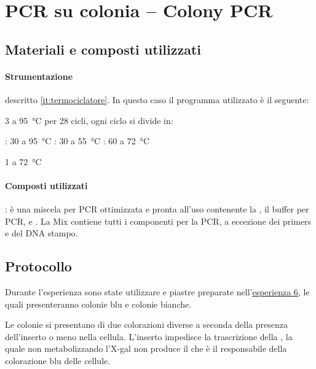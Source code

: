 \section{PCR su colonia -- \foreignlanguage{english}{Colony PCR}}

\subsection{Materiali e composti utilizzati}
\paragraph{Strumentazione}
\begin{itemize}
	\itemb[Termociclatore:] descritto \autoref{it:termociclatore}. In questo caso il programma utilizzato è il seguente:
	\begin{itemize}[squareItem]
		 \qty{3}{\min} a \qty{95}{\celsius}
		\itemb[Amplificazione] per 28 cicli, ogni ciclo si divide in:
		\begin{itemize}[squareItem]
			\itemb[Denaturazione]: \qty{30}{\sec} a \qty{95}{\celsius}
			\itemb[Ibridazione]: \qty{30}{\sec} a \qty{55}{\celsius}
			\itemb[Estensione]: \qty{60}{\sec} a \qty{72}{\celsius}
		\end{itemize}
		 \qty{1}{\min} a \qty{72}{\celsius}
	\end{itemize}
\end{itemize}

\paragraph{Composti utilizzati}
\begin{itemize}
	: è una miscela per PCR ottimizzata e pronta all'uso contenente la , il buffer per PCR,  e . 
	La Mix contiene tutti i componenti per la PCR, a eccezione dei primers e del DNA stampo.
\end{itemize}


\subsection{Protocollo}
\begin{Note}
	Durante l'esperienza sono state utilizzare e piastre preparate nell'\hyperref[sec:6]{esperienza 6}, le quali presenteranno colonie blu e colonie bianche.

	Le colonie si presentano di due colorazioni diverse a seconda della presenza dell'inserto o meno nella cellula. L'inserto impedisce la trascrizione della , la quale non metabolizzando l’\gls{X-gal} non produce il  che è il responsabile della colorazione blu delle cellule.
\end{Note}

